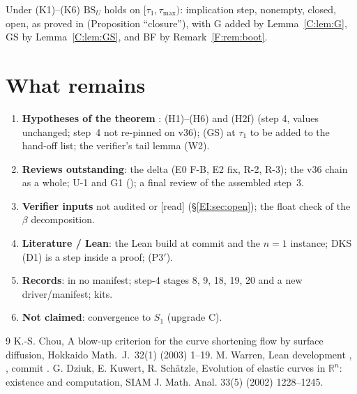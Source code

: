 \documentclass[11pt]{article}
\begin{document}
Under (K1)--(K6) $\mathrm{BS}_U$ holds on $[\tau_1,\tau_{\max})$: implication step, nonempty, closed, open, as proved in  (Proposition ``closure''), with G added by Lemma~\ref{C:lem:G}, GS by Lemma~\ref{C:lem:GS}, and BF by Remark~\ref{F:rem:boot}.



\section{What remains}\label{M:sec:remains}
\begin{enumerate}[leftmargin=*]
\item \textbf{Hypotheses of the theorem} \tH: (H1)--(H6) and (H2f) (step 4, values unchanged; step~4 not re-pinned on v36); (GS) at $\tau_1$ to be added to the hand-off list; the verifier's tail lemma (W2).
\item \textbf{Reviews outstanding}: the  delta (E0 F-B, E2 fix, R-2, R-3); the v36 chain as a whole; U-1 and G1 (); a final review of the assembled step~3.
\item \textbf{Verifier inputs} not audited or [read] (\S\ref{EI:sec:open}); the float check of the $\beta$ decomposition.
\item \textbf{Literature / Lean}: the Lean build at commit  and the $n=1$ instance; DKS (D1) is a step inside a proof; (P3$'$).
\item \textbf{Records}:  in no manifest; step-4 stages 8, 9, 18, 19, 20 and a new driver/manifest; kits.
\item \textbf{Not claimed}: convergence to $S_1$ (upgrade C).
\end{enumerate}

\begin{thebibliography}{9}
 K.-S. Chou, A blow-up criterion for the curve shortening flow by surface diffusion, Hokkaido Math.\ J.\ 32(1) (2003) 1--19.
 M. Warren, Lean development , , commit .
 G. Dziuk, E. Kuwert, R. Sch{\"a}tzle, Evolution of elastic curves in $\mathbb R^n$: existence and computation, SIAM J. Math. Anal. 33(5) (2002) 1228--1245.
\end{thebibliography}
\end{document}
